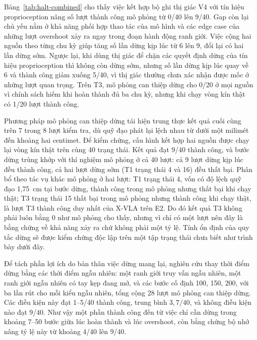 \label{sec:halt-vs-prior}
Bảng~\ref{tab:halt-combined} cho thấy việc kết hợp bộ ghi thị giác V4 với tín hiệu proprioception nâng số lượt thành công mô phỏng từ 0/40 lên 9/40. Gap còn lại chủ yếu nằm ở khả năng phối hợp thao tác của mô hình và các edge case của những lượt overshoot xảy ra ngay trong đoạn hành động ranh giới. Việc cộng hai nguồn theo từng chu kỳ giúp tăng số lần dừng kịp lúc từ 6 lên 9, đổi lại có hai lần dừng sớm. Ngược lại, khi dùng thị giác để chặn các quyết định dừng của tín hiệu proprioception thì không còn dừng sớm, nhưng số lần dừng kịp lúc quay về 6 và thành công giảm xuống 5/40, vì thị giác thường chưa xác nhận được mốc ở những lượt quan trọng. Trên T3, mô phỏng can thiệp dừng cho 0/20 ở mọi nguồn vì chính sách hiếm khi hoàn thành đủ ba chu kỳ, nhưng khi chạy vòng kín thật có 1/20 lượt thành công.

Phương pháp mô phỏng can thiệp dừng tái hiện trung thực kết quả cuối cùng trên 7 trong 8 lượt kiểm tra, dù quỹ đạo phát lại lệch nhau từ dưới một milimét đến khoảng hai centimet. Để kiểm chứng, cấu hình kết hợp hai nguồn được chạy lại vòng kín thật trên cùng 40 trạng thái. Kết quả đạt 9/40 thành công, và bước dừng trùng khớp với thí nghiệm mô phỏng ở cả 40 lượt: cả 9 lượt dừng kịp lúc đều thành công, cả hai lượt dừng sớm (T1 trạng thái 4 và 16) đều thất bại. Phân bổ theo tác vụ khác mô phỏng ở hai lượt: T1 trạng thái 4, vốn có độ lệch quỹ đạo 1,75~cm tại bước dừng, thành công trong mô phỏng nhưng thất bại khi chạy thật; T3 trạng thái 15 thất bại trong mô phỏng nhưng thành công khi chạy thật, là lượt T3 thành công duy nhất của X-VLA trên E2. Do đó kết quả T3 không phải luôn bằng 0 như mô phỏng cho thấy, nhưng vì chỉ có một lượt nên đây là bằng chứng về khả năng xảy ra chứ không phải một tỷ lệ. Tính ổn định của quy tắc dừng sẽ được kiểm chứng độc lập trên một tập trạng thái chưa biết như trình bày dưới đây.

Để tách phần lợi ích do bản thân việc dừng mang lại, nghiên cứu thay thời điểm dừng bằng các thời điểm ngẫu nhiên: một ranh giới truy vấn ngẫu nhiên, một ranh giới ngẫu nhiên có tay kẹp đang mở, và các bước cố định 100, 150, 200, với ba lần rút cho mỗi kiểu ngẫu nhiên, tổng cộng 28 lượt mô phỏng can thiệp dừng. Các điều kiện này đạt 1--5/40 thành công, trung bình $3{,}7/40$, và không điều kiện nào đạt 9/40. Như vậy một phần thành công đến từ việc chỉ cần dừng trong khoảng 7--50 bước giữa lúc hoàn thành và lúc overshoot, còn bằng chứng bộ nhớ nâng tỷ lệ này từ khoảng 4/40 lên 9/40.

\label{sec:halt-seen12}

